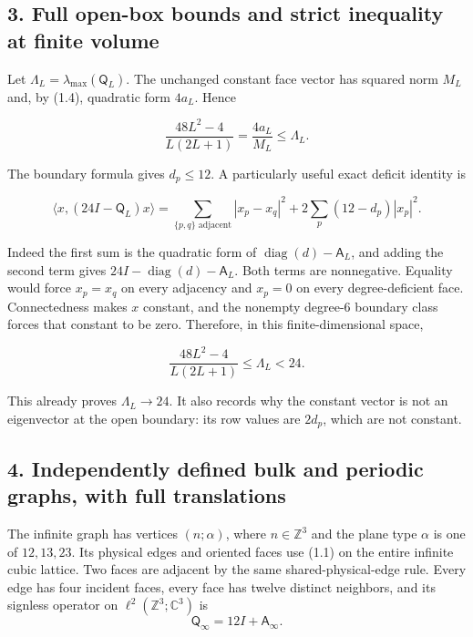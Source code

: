 \documentclass[
  11pt,
]{article}
\begin{document}
\subsection{3. Full open-box bounds and strict inequality at finite
volume}\label{magnetic-part-6-full-open-box-bounds-and-strict-inequality-at-finite-volume}

Let \(\Lambda_L=\lambda_{\max}(\mathsf Q_L)\). The unchanged constant
face vector has squared norm \(M_L\) and, by (1.4), quadratic form
\(4a_L\). Hence

\[
\boxed{
\frac{48L^2-4}{L(2L+1)}
=\frac{4a_L}{M_L}\le\Lambda_L.}
\tag{3.1}
\]

The boundary formula gives \(d_p\le12\). A particularly useful exact
deficit identity is

\[
\boxed{
\langle x,(24I-\mathsf Q_L)x\rangle
=\sum_{\{p,q\}\text{ adjacent}}|x_p-x_q|^2
+2\sum_p(12-d_p)|x_p|^2.}
\tag{3.2}
\]

Indeed the first sum is the quadratic form of
\(\operatorname{diag}(d)-\mathsf A_L\), and adding the second term gives
\(24I-\operatorname{diag}(d)-\mathsf A_L\). Both terms are nonnegative.
Equality would force \(x_p=x_q\) on every adjacency and \(x_p=0\) on
every degree-deficient face. Connectedness makes \(x\) constant, and the
nonempty degree-6 boundary class forces that constant to be zero.
Therefore, in this finite-dimensional space,

\[
\boxed{\frac{48L^2-4}{L(2L+1)}\le\Lambda_L<24.}
\tag{3.3}
\]

This already proves \(\Lambda_L\to24\). It also records why the constant
vector is not an eigenvector at the open boundary: its row values are
\(2d_p\), which are not constant.

\subsection{4. Independently defined bulk and periodic graphs, with full
translations}\label{magnetic-part-6-independently-defined-bulk-and-periodic-graphs-with-full-translations}

The infinite graph has vertices \((n;\alpha)\), where
\(n\in\mathbb Z^3\) and the plane type \(\alpha\) is one of
\(12,13,23\). Its physical edges and oriented faces use (1.1) on the
entire infinite cubic lattice. Two faces are adjacent by the same
shared-physical-edge rule. Every edge has four incident faces, every
face has twelve distinct neighbors, and its signless operator on
\(\ell^2(\mathbb Z^3;\mathbb C^3)\) is \[
\mathsf Q_\infty=12I+\mathsf A_\infty.
\tag{4.1}
\]
\end{document}
